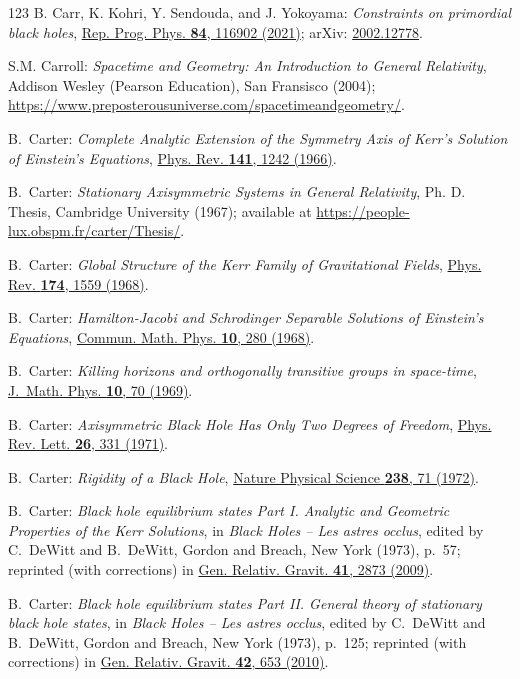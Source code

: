 \begin{thebibliography}{123}
B. Carr, K. Kohri, Y. Sendouda, and J. Yokoyama:
{\em Constraints on primordial black holes},
\href{https://doi.org/10.1088/1361-6633/ac1e31}{Rep. Prog. Phys. {\bf 84}, 116902 (2021)};
arXiv: \href{https://arxiv.org/abs/2002.12778}{2002.12778}.

S.M. Carroll: \emph{Spacetime and Geometry: An Introduction to General Relativity},
Addison Wesley (Pearson Education), San Fransisco (2004);
\url{https://www.preposterousuniverse.com/spacetimeandgeometry/}.

B.~Carter:
{\em Complete Analytic Extension of the Symmetry Axis of Kerr's Solution of Einstein's Equations},
\href{https://doi.org/10.1103/PhysRev.141.1242}{Phys. Rev. {\bf 141}, 1242 (1966)}.

B.~Carter: {\em Stationary Axisymmetric Systems in General Relativity},
Ph. D. Thesis, Cambridge University (1967); available at
\url{https://people-lux.obspm.fr/carter/Thesis/}.

B.~Carter:
{\em Global Structure of the Kerr Family of Gravitational Fields},
\href{https://doi.org/10.1103/PhysRev.174.1559}{Phys. Rev. {\bf 174}, 1559 (1968)}.

B.~Carter:
{\em Hamilton-Jacobi and Schrodinger Separable Solutions of Einstein's Equations},
\href{https://doi.org/10.1007/BF03399503}{Commun. Math. Phys. {\bf 10}, 280 (1968)}.

B.~Carter:
{\em Killing horizons and orthogonally transitive groups in space-time},
\href{https://doi.org/10.1063/1.1664763}{J.~Math. Phys. {\bf 10}, 70 (1969)}.

B.~Carter:
{\em Axisymmetric Black Hole Has Only Two Degrees of Freedom},
\href{https://doi.org/10.1103/PhysRevLett.26.331}{Phys. Rev. Lett. {\bf 26}, 331 (1971)}.

B.~Carter:
{\em Rigidity of a Black Hole},
\href{https://doi.org/10.1038/physci238071b0}{Nature Physical Science {\bf 238}, 71 (1972)}.

B.~Carter:
{\em Black hole equilibrium states Part I.
Analytic and Geometric Properties of the Kerr Solutions},
in {\em Black Holes -- Les astres occlus},  edited by C.~DeWitt and B.~DeWitt,
Gordon and Breach, New York (1973), p.~57; reprinted (with corrections) in
\href{https://doi.org/10.1007/s10714-009-0888-5}{Gen. Relativ. Gravit. {\bf 41}, 2873 (2009)}.

B.~Carter:
{\em Black hole equilibrium states Part II. General theory of stationary black hole states}, in {\em Black Holes -- Les astres occlus}, edited by C.~DeWitt and B.~DeWitt,
Gordon and Breach, New York (1973), p.~125; reprinted (with corrections) in
\href{https://doi.org/10.1007/s10714-009-0920-9}{Gen. Relativ. Gravit. {\bf 42}, 653 (2010)}.


\end{thebibliography}
